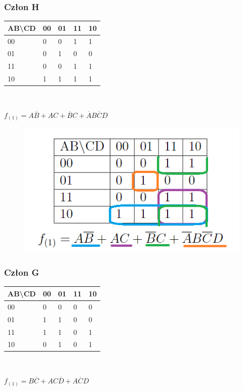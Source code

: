 \documentclass[a4paper]{article}
\begin{document}
\subsubsection{Człon H}
\begin{center}
\begin{tabular}{|l|l|l|l|l|}
  \hline
  AB\textbackslash{}CD & 00 & 01 & 11 & 10 \\ \hline
  00                   & 0  & 0  & 1  & 1  \\ \hline
  01                   & 0  & 1  & 0  & 0  \\ \hline
  11                   & 0  & 0  & 1  & 1  \\ \hline
  10                   & 1  & 1  & 1  & 1  \\ \hline
  \end{tabular}
  \\
\end{center}
\begin{center}
  $f_{(1)} = A\overline{B} + AC+\overline{B}C+\overline{A}B\overline{C}D $
\end{center}
\begin{figure}[H]
  \centering
  \includegraphics{tab_H.png}
 \end{figure}

\subsubsection{Człon G}
\begin{center}
\begin{tabular}{|l|l|l|l|l|}
  \hline
  AB\textbackslash{}CD & 00 & 01 & 11 & 10 \\ \hline
  00                   & 0  & 0  & 0  & 0  \\ \hline
  01                   & 1  & 1  & 0  & 0  \\ \hline
  11                   & 1  & 1  & 0  & 1  \\ \hline
  10                   & 0  & 1  & 0  & 1  \\ \hline
  \end{tabular}\\
\end{center}
\begin{center}
  $f_{(1)} = B\overline{C} + AC\overline{D}+A\overline{C}D $
\end{center}
\end{document}
